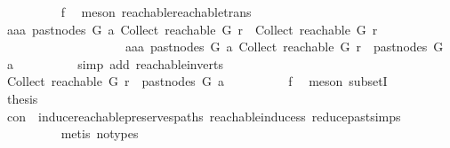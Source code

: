 \begin{isabellebody}
\ \ \ \ \ \ \ \ \isamarkupfalse%
\ f{}\ \isamarkupfalse%
\ {\isacharparenleft}{\kern0pt}meson\ reachable{}{\isacharunderscore}{\kern0pt}reachable{\isacharunderscore}{\kern0pt}trans{\isacharparenright}{\kern0pt}\isanewline
\ \ \ \ \ \ \isamarkupfalse%
\ \isamarkupfalse%
\ {\isachardoublequoteopen}aaa\ {\isacharparenleft}{\kern0pt}past{\isacharunderscore}{\kern0pt}nodes\ G\ a{\isacharparenright}{\kern0pt}\ {\isacharparenleft}{\kern0pt}Collect\ {\isacharparenleft}{\kern0pt}reachable\ G\ r{\isacharparenright}{\kern0pt}{\isacharparenright}{\kern0pt}\ {\isasymnotin}\ Collect\ {\isacharparenleft}{\kern0pt}reachable\ G\ r{\isacharparenright}{\kern0pt}\isanewline
\ \ \ \ \ \ \ \ \ \ \ \ \ \ \ \ \ \ \ {\isasymor}\ aaa\ {\isacharparenleft}{\kern0pt}past{\isacharunderscore}{\kern0pt}nodes\ G\ a{\isacharparenright}{\kern0pt}\ {\isacharparenleft}{\kern0pt}Collect\ {\isacharparenleft}{\kern0pt}reachable\ G\ r{\isacharparenright}{\kern0pt}{\isacharparenright}{\kern0pt}\ {\isasymin}\ past{\isacharunderscore}{\kern0pt}nodes\ G\ a{\isachardoublequoteclose}\isanewline
\ \ \ \ \ \ \ \ \isamarkupfalse%
\ {\isacharparenleft}{\kern0pt}simp\ add{\isacharcolon}{\kern0pt}\ reachable{\isacharunderscore}{\kern0pt}in{\isacharunderscore}{\kern0pt}verts{\isacharparenleft}{\kern0pt}{}{\isacharparenright}{\kern0pt}{\isacharparenright}{\kern0pt}\isanewline
\ \ \ \ \ \ \isamarkupfalse%
\ \isamarkupfalse%
\ {\isachardoublequoteopen}Collect\ {\isacharparenleft}{\kern0pt}reachable\ G\ r{\isacharparenright}{\kern0pt}\ {\isasymsubseteq}\ past{\isacharunderscore}{\kern0pt}nodes\ G\ a{\isachardoublequoteclose}\isanewline
\ \ \ \ \ \ \ \ \isamarkupfalse%
\ f{}\ \isamarkupfalse%
\ {\isacharparenleft}{\kern0pt}meson\ subsetI{\isacharparenright}{\kern0pt}\isanewline
\ \ \ \ \ \ \isamarkupfalse%
\ \isamarkupfalse%
\ {\isacharquery}{\kern0pt}thesis\isanewline
\ \ \ \ \ \ \ \ \isamarkupfalse%
\ con\ \ induce{\isacharunderscore}{\kern0pt}reachable{\isacharunderscore}{\kern0pt}preserves{\isacharunderscore}{\kern0pt}paths\ reachable{\isacharunderscore}{\kern0pt}induce{\isacharunderscore}{\kern0pt}ss\ reduce{\isacharunderscore}{\kern0pt}past{\isachardot}{\kern0pt}simps\isanewline
\ \ \ \ \ \ \ \ \isamarkupfalse%
\ {\isacharparenleft}{\kern0pt}metis\ {\isacharparenleft}{\kern0pt}no{\isacharunderscore}{\kern0pt}types{\isacharparenright}{\kern0pt}{\isacharparenright}{\kern0pt}\isanewline

\end{isabellebody}
